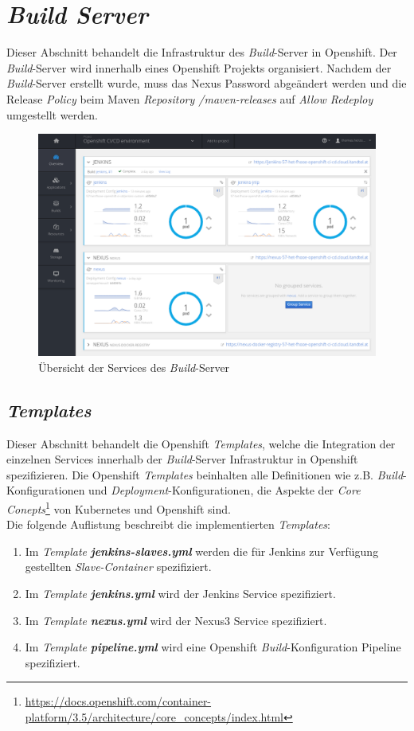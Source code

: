 \section{\emph{Build Server}}
\label{sec:buildserver}
Dieser Abschnitt behandelt die Infrastruktur des \emph{Build}-Server in Openshift. Der \emph{Build}-Server wird innerhalb eines Openshift Projekts organisiert. Nachdem der \emph{Build}-Server erstellt wurde, muss das Nexus Password abgeändert werden und die Release \emph{Policy} beim Maven \emph{Repository /maven-releases} auf \emph{Allow Redeploy} umgestellt werden.

\begin{figure}[H]
	\centering
	\includegraphics[scale=0.55]{image/buildserver-overview.png}
	\caption{Übersicht der Services des \emph{Build}-Server}
	\label{fig:appserver}
\end{figure}

\subsection{\emph{Templates}}
\label{sec:openshift-templates}
Dieser Abschnitt behandelt die Openshift \emph{Templates}, welche die Integration der einzelnen Services innerhalb der \emph{Build}-Server Infrastruktur in Openshift spezifizieren. Die Openshift \emph{Templates} beinhalten alle Definitionen wie z.B. \emph{Build}-Konfigurationen und \emph{Deployment}-Konfigurationen, die Aspekte der \emph{Core Conepts}\footnote{\url{https://docs.openshift.com/container-platform/3.5/architecture/core_concepts/index.html}} von Kubernetes und Openshift sind. \\

Die folgende Auflistung beschreibt die implementierten \emph{Templates}:
\begin{enumerate}
	\item Im \emph{Template} \textbf{\emph{jenkins-slaves.yml}} werden die für Jenkins zur Verfügung gestellten \emph{Slave-Container} spezifiziert.
	\item Im \emph{Template} \textbf{\emph{jenkins.yml}} wird der Jenkins Service spezifiziert.
	\item Im \emph{Template} \textbf{\emph{nexus.yml}} wird der Nexus3 Service spezifiziert.
	\item Im \emph{Template} \textbf{\emph{pipeline.yml}} wird eine Openshift \emph{Build}-Konfiguration Pipeline spezifiziert.
\end{enumerate}

